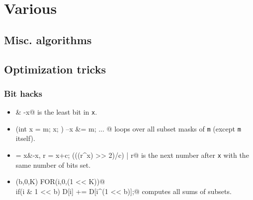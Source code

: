 \chapter{Various}

\section{Misc. algorithms}

\section{Optimization tricks}
	\subsection{Bit hacks}
		\begin{itemize}
			\item \verb@x & -x@ is the least bit in \texttt{x}.
			\item \verb@for(int x = m; x; ) { --x &= m; ... }@ loops over all subset masks of \texttt{m} (except \texttt{m} itself).
			\item \verb@c = x&-x, r = x+c; (((r^x) >> 2)/c) | r@ is the next number after \texttt{x} with the same number of bits set.
			\item \verb@FOR(b,0,K) FOR(i,0,(1 << K))@ \\ \verb@  if(i & 1 << b) D[i] += D[i^(1 << b)];@ computes all sums of subsets.
		\end{itemize}
